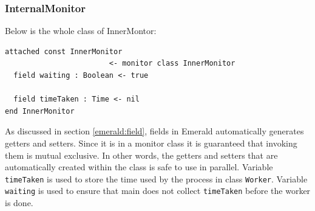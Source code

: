 \subsubsection{InternalMonitor}
Below is the whole class of InnerMontor:
\begin{lstlisting}[language=emerald]
attached const InnerMonitor 
                        <- monitor class InnerMonitor
  field waiting : Boolean <- true

  field timeTaken : Time <- nil
end InnerMonitor
\end{lstlisting}
As discussed in section \ref{emerald:field}, fields in Emerald automatically generates getters and setters. Since it is in a monitor class it is guaranteed that invoking them is mutual exclusive. In other words, the getters and setters that are automatically created within the class is safe to use in parallel. Variable \verb|timeTaken| is used to store the time used by the process in class \verb|Worker|. Variable \verb|waiting| is used to ensure that main does not collect \verb|timeTaken| before the worker is done.





